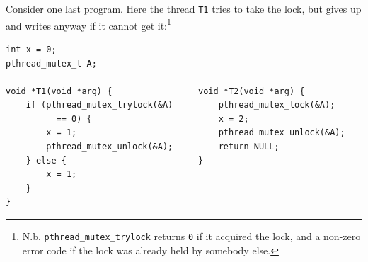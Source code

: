 \documentclass[addpoints]{exam}
\newcommand{\Code}[1]{\texttt{#1}}
\newcommand{\nonAnswerNewPage}{\ifprintanswers \vfill \else \newpage \fi}
\newcommand{\LS}[1]{\texttt{\{#1\}}}
\begin{document}
\begin{questions}
\nonAnswerNewPage

\question Consider one last program. Here the thread \texttt{T1} tries
  to take the lock, but gives up and writes anyway if it cannot get
  it:\footnote{N.b. \Code{pthread_mutex_trylock} returns \Code{0} if it
    acquired the lock, and a non-zero error code if the lock was
    already held by somebody else.}

\begin{verbatim}
int x = 0;
pthread_mutex_t A;

void *T1(void *arg) {                 void *T2(void *arg) {
    if (pthread_mutex_trylock(&A)         pthread_mutex_lock(&A);
          == 0) {                         x = 2;
        x = 1;                            pthread_mutex_unlock(&A);
        pthread_mutex_unlock(&A);         return NULL;
    } else {                          }
        x = 1;
    }
}
\end{verbatim}

\end{questions}
\end{document}
